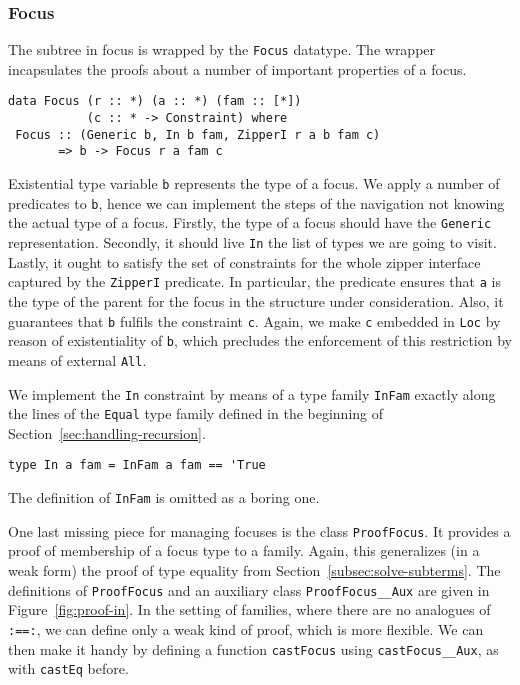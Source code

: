\documentclass[runningheads]{llncs}
\newcommand{\K}[1]{\lstinline{#1}}
\begin{document}
\subsubsection{Focus}

The subtree in focus is wrapped by the \K{Focus} datatype. 
The wrapper incapsulates the proofs about a number of important properties of a focus.
\begin{lstlisting}
data Focus (r :: *) (a :: *) (fam :: [*])
           (c :: * -> Constraint) where
 Focus :: (Generic b, In b fam, ZipperI r a b fam c)
       => b -> Focus r a fam c
\end{lstlisting}
Existential type variable \K{b} represents the type of a focus. We apply a number of predicates to \K{b}, hence we can implement the steps of the navigation not knowing the actual type of a focus. Firstly, the type of a focus should have the \K{Generic} representation. Secondly, it should live \K{In} the list of types we are going to visit. Lastly, it ought to satisfy the set of constraints for the whole zipper interface captured by the \K{ZipperI} predicate. In particular, the predicate ensures that \K{a} is the type of the parent for the focus in the structure under consideration. Also, it guarantees that \K{b} fulfils the constraint \K{c}. Again, we make \K{c} embedded in \K{Loc} by reason of existentiality of \K{b}, which precludes the enforcement of this restriction by means of external \K{All}.

We implement the \K{In} constraint by means of a type family \K{InFam} exactly along the lines of the \K{Equal} type family defined in the beginning of Section~\ref{sec:handling-recursion}. 
\begin{lstlisting}
type In a fam = InFam a fam == 'True
\end{lstlisting}
The definition of \K{InFam} is omitted as a boring one.

One last missing piece for managing focuses is the class \K{ProofFocus}. It provides a proof of membership of a focus type to a family. Again, this generalizes (in a weak form) the proof of type equality from Section~\ref{subsec:solve-subterms}. The definitions of \K{ProofFocus} and an auxiliary class \K{ProofFocus__Aux} are given in Figure~\ref{fig:proof-in}. In the setting of families, where there are no analogues of \K{:==:}, we can define only a weak kind of proof, which is more flexible. We can then make it handy by defining a function \K{castFocus} using \K{castFocus__Aux}, as with \K{castEq} before.
\end{document}
